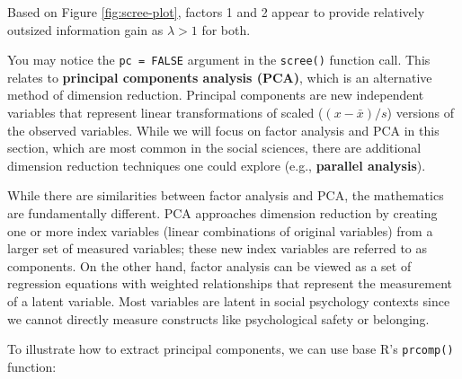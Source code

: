 \documentclass[
]{book}
\begin{document}
Based on Figure \ref{fig:scree-plot}, factors 1 and 2 appear to provide relatively outsized information gain as \(\lambda > 1\) for both.

You may notice the \texttt{pc\ =\ FALSE} argument in the \texttt{scree()} function call. This relates to \textbf{principal components analysis (PCA)}, which is an alternative method of dimension reduction. Principal components are new independent variables that represent linear transformations of scaled (\((x - \bar{x}) / s\)) versions of the observed variables. While we will focus on factor analysis and PCA in this section, which are most common in the social sciences, there are additional dimension reduction techniques one could explore (e.g., \textbf{parallel analysis}).

While there are similarities between factor analysis and PCA, the mathematics are fundamentally different. PCA approaches dimension reduction by creating one or more index variables (linear combinations of original variables) from a larger set of measured variables; these new index variables are referred to as components. On the other hand, factor analysis can be viewed as a set of regression equations with weighted relationships that represent the measurement of a latent variable. Most variables are latent in social psychology contexts since we cannot directly measure constructs like psychological safety or belonging.

To illustrate how to extract principal components, we can use base R's \texttt{prcomp()} function:
\end{document}
